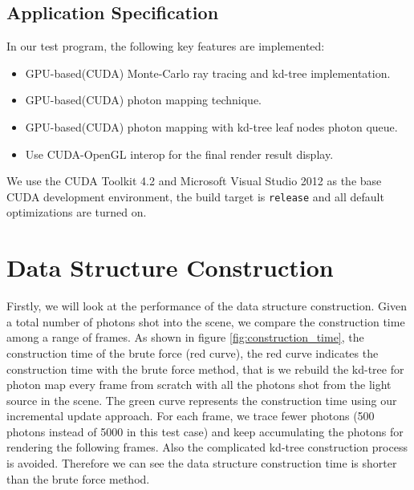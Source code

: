 \subsection{Application Specification}

In our test program, the following key features are implemented:

\begin{itemize}

\item{GPU-based(CUDA) Monte-Carlo ray tracing and kd-tree implementation.}

\item{GPU-based(CUDA) photon mapping technique. }

\item{GPU-based(CUDA) photon mapping with kd-tree leaf nodes photon queue.}

\item{Use CUDA-OpenGL interop for the final render result display. }

\end{itemize}

We use the CUDA Toolkit 4.2 and Microsoft Visual Studio 2012 as the base CUDA development environment, the build target is {\tt release} and all default optimizations are turned on.



\section{Data Structure Construction}
\label{sec:build_time}

Firstly, we will look at the performance of the data structure construction. Given a total number of photons shot into the scene, we compare the construction time among a range of frames. As shown in figure \ref{fig:construction_time}, the construction time of the brute force (red curve), the red curve indicates the construction time with the brute force method, that is we rebuild the kd-tree for photon map every frame from scratch with all the photons shot from the light source in the scene. The green curve represents the construction time using our incremental update approach. For each frame, we trace fewer photons (500 photons instead of 5000 in this test case) and keep accumulating the photons for rendering the following frames. Also the complicated kd-tree construction process is avoided. Therefore we can see the data structure construction time is shorter than the brute force method.

